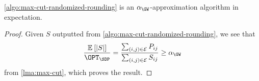 \begin{theorem}\label{thm:max-cut}
	\autoref{algo:max-cut-randomized-rounding} is an \(\alpha _\GW\)-approximation algorithm in expectation.
\end{theorem}
\begin{proof}
	Given \(S\) outputted from \autoref{algo:max-cut-randomized-rounding}, we see that
	\[
		\frac{\mathbb{E}_{}\left[\left\vert S \right\vert \right] }{\OPT_{\SDP }} = \frac{\sum_{(i, j)\in \mathcal{E} } P_{ij} }{\sum_{(i, j)\in \mathcal{E} } S_{ij} } \geq \alpha _{\GW }
	\]
	from \autoref{lma:max-cut}, which proves the result.
\end{proof}